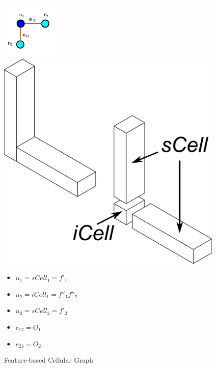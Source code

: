 \begin{figure}[!h]
\centering 
\begin{minipage}[h]{0.28\linewidth} 
\includegraphics[width=0.8\linewidth]{../Common/images/FeatureInteractionGraph.pdf}
\end{minipage}
\begin{minipage}[h]{0.28\linewidth} 
\centering \includegraphics[width=0.7\linewidth]{../Common/images/CellDecompExample.pdf}
\end{minipage}
\begin{minipage}[h]{0.28\linewidth} 
\begin{itemize}[noitemsep,topsep=2pt,parsep=2pt,partopsep=2pt,label={}]
\item $n_1 = sCell_1= f'_1$
\item $n_2 = iCell_1 = f''_1f''_2$
\item $n_3 = sCell_2 = f'_2$
\item $e_{12} = O_1$
\item $e_{23}= O_2$
\end{itemize}
\end{minipage}
\caption{Feature-based Cellular Graph}
\label{fig_featgraph}
\end{figure}

